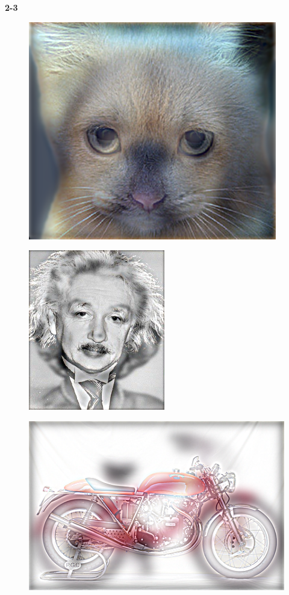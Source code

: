 \documentclass[]{article}
\begin{document}
\textbf{2-3}
\begin{figure}[H]
	\centering
	\includegraphics{catdog.png}
	\label{fig:catdog}
\end{figure}

\begin{figure}[H]
	\centering
	\includegraphics{meinstein.png}
	\label{fig:meinstein}
\end{figure}

\begin{figure}[H]
	\centering
	\includegraphics{bike-moto.png}
	\label{fig:bike-moto}
\end{figure}
\end{document}
